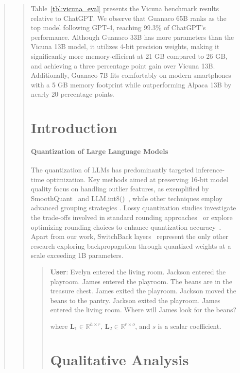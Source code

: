 \begin{quote}
\begin{quote}
Table~\ref{tbl:vicuna_eval} presents the Vicuna benchmark \cite{vicuna2023} results relative to ChatGPT. We observe that {Guanaco} 65B ranks as the top model following GPT-4, reaching 99.3\% of ChatGPT’s performance. Although {Guanaco} 33B has more parameters than the Vicuna 13B model, it utilizes 4-bit precision weights, making it significantly more memory-efficient at 21 GB compared to 26 GB, and achieving a three percentage point gain over Vicuna 13B. Additionally, {Guanaco} 7B fits comfortably on modern smartphones with a 5 GB memory footprint while outperforming Alpaca 13B by nearly 20 percentage points.

\section{Introduction}

\paragraph{Quantization of Large Language Models} The quantization of LLMs has predominantly targeted inference-time optimization. Key methods aimed at preserving 16-bit model quality focus on handling outlier features, as exemplified by SmoothQuant~\citep{xiao2022smoothquant} and LLM.int8()~\citep{dettmers2022llm}, while other techniques employ advanced grouping strategies \citep{park2022nuqmm, yao2022zeroquant}. Lossy quantization studies investigate the trade-offs involved in standard rounding approaches~\citep{dettmers2022case,zeng2022glm,pope2022efficiently} or explore optimizing rounding choices to enhance quantization accuracy~\citep{frantar2022gptq}. Apart from our work, SwitchBack layers~\citep{wortsman2023stable} represent the only other research exploring backpropagation through quantized weights at a scale exceeding 1B parameters.

\begin{quote}
    \textbf{User}: Evelyn entered the living room. Jackson entered the playroom. James entered the playroom. The beans are in the treasure chest. James exited the playroom. Jackson moved the beans to the pantry. Jackson exited the playroom. James entered the living room. Where will James look for the beans?

where $\mathbf{L}_1\in  \mathbb{R}^{h\times r}$, $\mathbf{L}_2\in  \mathbb{R}^{r\times o}$, and $s$ is a scalar coefficient.

\section{Qualitative Analysis}


\end{quote}
\end{quote}
\end{quote}
